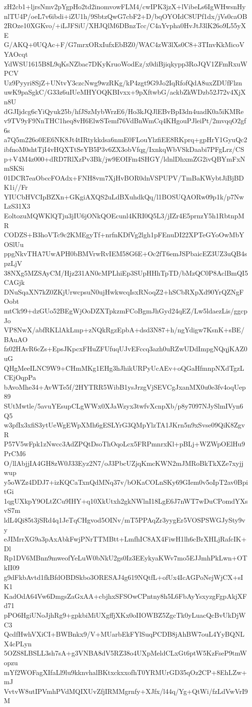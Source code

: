 zH2cb1+ljrsNmv2pYgpHo2td2inomvowFLM4/cwIPK3jzX+lVibeLs6IgWHwsnHy
nlTU4P/oeL7v6ibdi+iZU1h/9SbtzQwG7cbF2+D/bqOYOIdC8UPf1dx/jVs0caOB
2ROze10XGKvo/+iLJFSiU/XHJQlM6DBnzTcc/C4aYvpha0HvJtJ3lK26o9L55yXE
G/AKQ+0UQAc+F/G7mrxORxIufxEbBZ0/WAC4zW3lXs0C8+3TInvKkMicoVYAOcqt
YdWSU1615B8L9qKsNZbac7DKyKruoWodEz/x0diBjiqkypp3RoJQV1ZFmRxuWPCV
Uz9Pyyri8SjZ+UNtvY3czcNwg9wzRKg/kP4zgt9G9Jo2IqRfofQdA8uxZDUfFlzn
uwK9paSgkC/G33z6uIUeMHYOQKBIvxx+9pXftwbG/ackbZkWDzb52J72v4XjXn8U
dGJIjdcg6cYiQyuk25b/hfJSzMybWrzE6/Ho3kJQJlEBvBpI3dn4uadK0a5iKMRe
v9TV9yF9NnTHC1heq8vH6ElwSTemf76VdBnWmCq4KHgouPJleiPt/2mvqqO2gf6s
a7Q5m226o0EE6NK8Jt4tIRtykkdsa6nmE0FLouYlzfiEE8RKprq+gpHrY1GyuQc2
ibfnoM0shtTjI4vHQXTtSeYB5P3v6ZX3obVfqg/IxnkqWbVSkDaabi7PFgLrz/CS
p+V4M4z000+dRD7RlXzPv3Bk/jw9EOIFm4SHGY/ldnlDhxmZG2ivQBYmFxNmSKSi
01DCR7eaObccFOAdx+FNH8vm7XjHvBOR0dnVSPUPV/TmBaKWybtJiBjBDK1i//Fr
YIUCbHVCIpBZXn+GKgiAXQS2uLdBXuhdkQq/l1BOSUQAORw09p1k/p7NwLzS31X3
EoltozuMQWKlQTju3jIU6jONkQOEcunl4KRI0Q5L3/jIZr4E5prnzY5h1RbtnpMR
CODZS+B3hoVTc9c2KMEgyTf+nrfnKDfVg2lgh1pFEnuDI22XPTeGYoOwMbYOSlUu
ppgNkvTHA7UwAPH0bBMVrwRvIEM58G6E+Oc2fT6emJSPbaicEZ3UZ3uQB4spzLjV
38NXg5MZSAyCM/Hjz231AN0cMPLhiEp3SUpHHhTpTD/bMzQC0P8AclBmQI5CAGjk
DNuSqaXN7kZ0ZKjUrwcpsuN0ujHwkwcqIsxRNoqZ2+hSCbRXpXd90YrQZNgFOobt
mtCk99+dzGUo52BEgWjOoDZXTpkzmFCoBgmJhGyd24qEZ/Lw5ldaezLis/ggcpJo
VP8NwX/abfRKLlAkLmp+zNQkRgzEpbA+dsd3N87+h/ngYdigw7KsnK+sBE/BAuAO
fz02HAvR6cZs+EpsJKpcxFHuZFUfuqUJvEFccq3azh0uRZwUDdImpgNQqjKAZ0uG
QHgMeeILNC9W9+CHmMKg1EHg3hJhikURPyUcAEv+oQGaHfmnpNXdTgzLCEjOqpPa
bAvoMhe34+AvWTe5f/2HYTRR5WibB1ysJrzgVjSEVCgJxanMX0u0e3fv4oqUep89
SUtMwtle/5avuYEsupCLgWWx0XJaWzyx3twfvXcnpXb/p8y7097NJySlmIVyn6Q5
w3pfIx3xfiS3ytUeWgEWpXMh6gESLYrG3QMpYlzTA1JKrn5n9xSvse09QiK8ZgvR
P57V5wFpk1zNwcc3AdZPQtDsoThOqoLcx5FRPmnrxKl+pBLj+WZWpOElHu9PrCM6
O/llAbjjIA4GH8zW0J33Eyz2N7/oJ3PbcUZjqKmcKWN2mJMRoBkTkXZe7xyjjwup
y5oWZz4DDJ7+izKQCaTxnQdMNq37v/bOKaCOLnSKy69GIem0v5oIpT2av0BpitGi
1qgUXkpY9OLtZCu9IHY+q10XkUtxh2gkNWlnI18LgE6J7nWT7wDuCPomdYXsvS7m
ldL4Qi85t3jSRd4q1JeTqCHgvod5OINv/mT5PPAqZr3yygEr5VOSPSWGJySty9vy
eJIMrrXG9a3pAxAbkFwjPNrTTMBtt+LmfhIC8AX4FiwH1lh6cBrXHLjRafcIK+Dl
Rp1DV6MBnn9mweofYeLuW0bNkU2gs0Iz3EEykyaKWv7mo5EJJmhPkLwn+OTkII09
g9dFkbAvtd1fkBfdOBDSkbo3ORESAJ4g619NQtfL+ofUx4IcAGPoNejWjCX+sIK1
KadOdA64Vw6DmgsZaGxAA+cbjhxSFSOwCPntny8h5L6FbAyYsxyzgFgpAkjXFd71
pPO6HgiUNoJjhRg9+gpkbiMiUXgffjXKx0oIIOWBZ5ZgcTk0yLuacQcBvUkDjWC3
QcdfHwhVXiCI+BWBnkx9/V+MUarbEkFYlSuqPCDB8jAhBW7ouL4YyBQNLX4cPLyn
5OZS8LBSLL3sh7sA+g3VNBA8dV5RZ38o4UXpMeldCLxGt6ptW5KzFseP9tmWopzu
mYf2WOFagXIfaLl9lu9kknvhalBKtxckxxofhT0YRMUrGD35qOz2CP+8EhLZw+mJ
VvtvW8utIPVmhPVdMQIXUvZfjIRMMgrnfy+XJfx/l44q/Yg+QtWi/fzLdVwVrI9M
